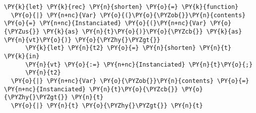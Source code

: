 \begin{Verbatim}[commandchars=\\\{\}]
\PY{k}{let} \PY{k}{rec} \PY{n}{shorten} \PY{o}{=} \PY{k}{function}
  \PY{o}{|} \PY{n+nc}{Var} \PY{o}{(}\PY{o}{\PYZob{}}\PY{n}{contents} \PY{o}{=} \PY{n+nc}{Instanciated} \PY{o}{(}\PY{n+nc}{Var} \PY{o}{\PYZus{}} \PY{k}{as} \PY{n}{t}\PY{o}{)}\PY{o}{\PYZcb{}} \PY{k}{as} \PY{n}{vt}\PY{o}{)} \PY{o}{\PYZhy{}\PYZgt{}}
      \PY{k}{let} \PY{n}{t2} \PY{o}{=} \PY{n}{shorten} \PY{n}{t} \PY{k}{in}
      \PY{n}{vt} \PY{o}{:=} \PY{n+nc}{Instanciated} \PY{n}{t}\PY{o}{;}
      \PY{n}{t2}
  \PY{o}{|} \PY{n+nc}{Var} \PY{o}{\PYZob{}}\PY{n}{contents} \PY{o}{=} \PY{n+nc}{Instanciated} \PY{n}{t}\PY{o}{\PYZcb{}} \PY{o}{\PYZhy{}\PYZgt{}} \PY{n}{t}
  \PY{o}{|} \PY{n}{t} \PY{o}{\PYZhy{}\PYZgt{}} \PY{n}{t}
\end{Verbatim}
